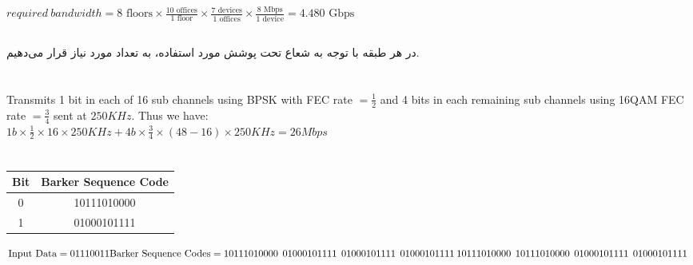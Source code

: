 \documentclass{article}
\begin{document}
\subsection{}
\begin{latin}
$
required\: bandwidth = 8 \text{ floors} \times\frac{10 \text{ offices}}{1 \text{ floor}} \times \frac{7 \text{ devices}}{1 \text{ offices}} \times \frac{8 \text{ Mbps}}{1 \text{ device}} = 4.480 \text{ Gbps}
$
\end{latin}
\subsection{}
در هر طبقه با توجه به شعاع تحت پوشش  مورد استفاده، به تعداد مورد نیاز  قرار می‌دهیم.

\section{}
\begin{latin}
Transmits 1 bit in each of 16 sub channels using BPSK with FEC rate $=\frac{1}{2}$ and 4 bits in each remaining sub channels using 16QAM FEC rate $=\frac{3}{4}$ sent at $250 KHz$. Thus we have: \\
$
1b \times \frac{1}{2} \times 16 \times 250 KHz + 4b \times \frac{3}{4} \times \left( 48 - 16 \right) \times 250 KHz = 26 Mbps
$
\end{latin}


\section{}

\begin{latin}
\begin{table}[H]
\centering
\begin{tabular}{|c|c|}
\hline
\textbf{Bit} & \textbf{Barker Sequence Code} \\ \hline
0            & 10111010000                   \\ \hline
1            & 01000101111                   \\ \hline
\end{tabular}
\end{table}
$
\text{Input Data} = 01110011 \\
\text{Barker Sequence Codes} = 10111010000 \:\:01000101111 \:\:01000101111 \:\:01000101111 \:\: \\
10111010000 \:\:10111010000 \:\:01000101111 \:\:01000101111 \:\:
$
\end{latin}
\end{document}
